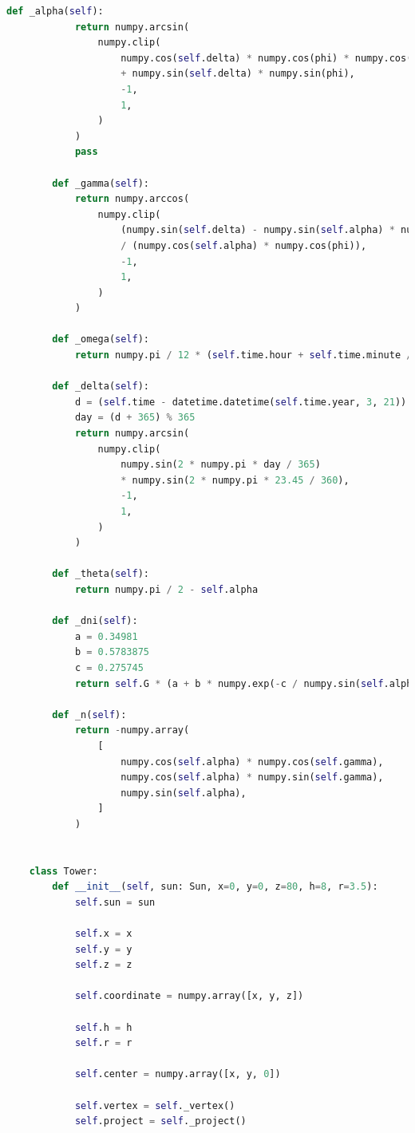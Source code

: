 \documentclass[withoutpreface,bwprint]{cumcmthesis} %
\begin{document}
\begin{appendices}
\begin{lstlisting}[language=python]
        def _alpha(self):
            return numpy.arcsin(
                numpy.clip(
                    numpy.cos(self.delta) * numpy.cos(phi) * numpy.cos(self.omega)
                    + numpy.sin(self.delta) * numpy.sin(phi),
                    -1,
                    1,
                )
            )
            pass
    
        def _gamma(self):
            return numpy.arccos(
                numpy.clip(
                    (numpy.sin(self.delta) - numpy.sin(self.alpha) * numpy.sin(phi))
                    / (numpy.cos(self.alpha) * numpy.cos(phi)),
                    -1,
                    1,
                )
            )
    
        def _omega(self):
            return numpy.pi / 12 * (self.time.hour + self.time.minute / 60 - 12)
    
        def _delta(self):
            d = (self.time - datetime.datetime(self.time.year, 3, 21)).days
            day = (d + 365) % 365
            return numpy.arcsin(
                numpy.clip(
                    numpy.sin(2 * numpy.pi * day / 365)
                    * numpy.sin(2 * numpy.pi * 23.45 / 360),
                    -1,
                    1,
                )
            )
    
        def _theta(self):
            return numpy.pi / 2 - self.alpha
    
        def _dni(self):
            a = 0.34981
            b = 0.5783875
            c = 0.275745
            return self.G * (a + b * numpy.exp(-c / numpy.sin(self.alpha)))
    
        def _n(self):
            return -numpy.array(
                [
                    numpy.cos(self.alpha) * numpy.cos(self.gamma),
                    numpy.cos(self.alpha) * numpy.sin(self.gamma),
                    numpy.sin(self.alpha),
                ]
            )
    
    
    class Tower:
        def __init__(self, sun: Sun, x=0, y=0, z=80, h=8, r=3.5):
            self.sun = sun
    
            self.x = x
            self.y = y
            self.z = z
    
            self.coordinate = numpy.array([x, y, z])
    
            self.h = h
            self.r = r
    
            self.center = numpy.array([x, y, 0])
    
            self.vertex = self._vertex()
            self.project = self._project()
    

\end{lstlisting}
\end{appendices}
\end{document}
